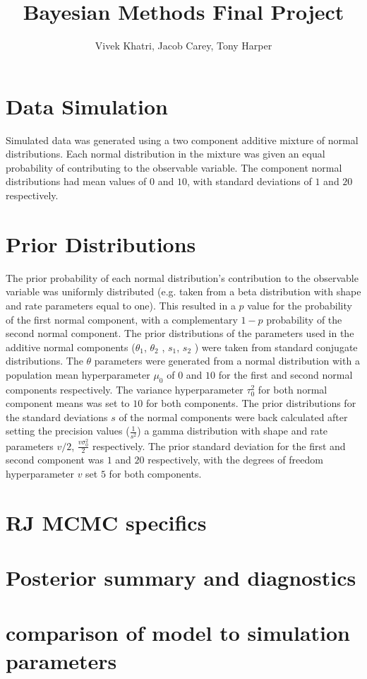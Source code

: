 \documentclass[12pt]{article}
\title{Bayesian Methods Final Project}
\author{Vivek Khatri, Jacob Carey, Tony Harper}
\date{}
\begin{document}
\section*{Data Simulation}
Simulated data was generated using a two component additive mixture of normal distributions.  Each normal distribution in the mixture was given an equal probability of contributing to the observable variable. The component normal distributions had mean values of $0$ and $10$, with standard deviations of $1$ and $20$ respectively.

\section*{Prior Distributions}
The prior probability of each normal distribution’s contribution to the observable variable was uniformly distributed (e.g. taken from a beta distribution with shape and rate parameters equal to one). This resulted in a $p$ value for the probability of the first normal component, with a complementary $1-p$ probability of the second normal component.
The prior distributions of the parameters used in the additive normal components ($\theta_1$, $\theta_2$ , $s_1$, $s_2$ ) were taken from standard conjugate distributions. The $\theta$ parameters were generated from a normal distribution with a population mean hyperparameter $\mu_0$ of $0$ and $10$ for the first and second normal components respectively. The variance hyperparameter $\tau_0^2$ for both normal component means was set to $10$ for both components.
	The prior distributions for the standard deviations $s$ of the normal components were back calculated after setting the precision values ($\frac{1}{s^2}$)  a gamma distribution with shape and rate parameters $v/2$, $\frac{v\sigma_0^2}{2}$ respectively. The prior standard deviation for the first and second component  was $1$ and $20$ respectively, with the degrees of freedom hyperparameter $v$ set $5$ for both components. 

\section*{RJ MCMC specifics}

\section*{Posterior summary and diagnostics}

\section*{comparison of model to simulation parameters}
\end{document}
